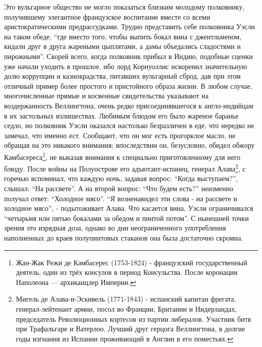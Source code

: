 \documentclass[
  oneside,
  12pt,
  titlepage]{book}
\begin{document}
Это вульгарное общество не могло показаться близким молодому полковнику, получившему элегантное французское воспитание вместе со всеми аристократическими предрассудками. Трудно представить себе полковника Уэсли на таком обеде, ``где вместо того, чтобы выпить бокал вина с джентльменом, кидали друг в друга жареными цыплятами, а дамы объедались сладостями и пирожными''. Скорей всего, когда полковник прибыл в Индию, подобные сценки уже начали уходить в прошлое, ибо лорд Корнуоллис искоренил значительную долю коррупции и казнокрадства, питавших вульгарный сброд, дав при этом отличный пример более простого и пристойного образа жизни. В любом случае, многочисленные прямые и косвенные свидетельства указывают на воздержанность Веллингтона, очень редко присоединявшегося к англо-индийцам в их застольных излишествах. Любимым блюдом его было жареное баранье седло, но полковник Уэсли оказался настолько безразличен в еде, что нередко не замечал, что именно ест. Сообщают, что он мог есть прогорклое масло, не обращая на это никакого внимания; впоследствии он, безусловно, обидел обжору Камбасереса\footnote{Жан-Жак Режи де Камбасерес (1753-1824) - французский государственный деятель, один из трёх консулов в период Консульства. После коронации Наполеона --- архиканцлер Империи.}, не выказав внимания к специально приготовленному для него блюду. После войны на Полуострове его адъютант-испанец, генерал Алава\footnote{Мигель де Алава-и-Эскивель (1771-1843) - испанский капитан фрегата, генерал-лейтенант армии, посол во Франции, Британии и Нидерландах, председатель Революционных кортесов из партии либералов. Участник битв при Трафальгаре и Ватерлоо. Лучший друг герцога Веллингтона, в долгие годы изгнания из Испании проживающий в Англии в его поместьях.}, с горечью вспоминал, что каждую ночь, задавая вопрос: ``Когда выступаем?'', слышал: ``На рассвете''. А на второй вопрос: ``Что будем есть?'' неизменно получал ответ: ``Холодное мясо''. ``Я возненавидел эти слова - на рассвете и холодное мясо'', - подытоживает Алава. Что касается вина, Уэсли ограничивался ``четырьмя или пятью бокалами за обедом и пинтой потом''. С нынешней точки зрения это изрядная доза, однако во дни неограниченного употребления наполненных до краев полупинтовых стаканов она была достаточно скромна.
\end{document}
